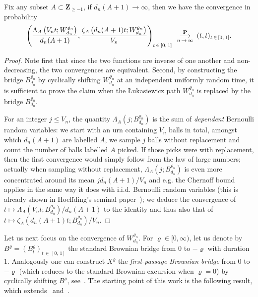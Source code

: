 \documentclass[AHL,Unicode,longabstracts,published]{cedram}
\newcommand{\ensembles}[1]{\mathbf{#1}}
\newcommand{\Z}{\ensembles{Z}}
\renewcommand{\P}{\ensembles{P}}
\newcommand{\1}{\ensembles{1}}
\renewcommand{\le}{\leqslant}
\renewcommand{\ge}{\geqslant}
\newcommand{\Wfn}{W_{d_n}^{\varrho_n}}
\newcommand{\Bfn}{B_{d_n}^{\varrho_n}}
\newcommand{\vertices}{V}
\newcommand{\cvproba}[1][n]{\enskip\mathop{\longrightarrow}^{\P}_{#1\,\to\, \infty}\enskip}
\begin{document}
\begin{lemm}\label{lem:proportion_feuilles}
Fix any subset $A \subset \Z_{\ge -1}$, if $d_n(A+1) \to \infty$, then we have the convergence in probability
\[
\left(\frac{\Lambda_A\left(\vertices_n t; \Wfn\right)}{d_n(A+1)}, \frac{\zeta_A\left(d_n(A+1) t; \Wfn\right)}{\vertices_n}\right)_{t\,\in\,[0,\,1]} \cvproba (t, t)_{t \,\in\,[0,\,1]}.
\]
\end{lemm}

\begin{proof}
Note first that since the two functions are inverse of one another and non-decreasing, the two convergences are equivalent. Second, by constructing the bridge $\Bfn$ by cyclically shifting $\Wfn$ at an independent uniformly random time, it is sufficient to prove the claim when the {\L}ukasiewicz path $\Wfn$ is replaced by the bridge $\Bfn$.

For an integer $j \le V_n$, the quantity $\Lambda_A(j; \Bfn)$ is the sum of \emph{dependent} Bernoulli random variables: we start with an urn containing $\vertices_n$ balls in total, amongst which $d_n(A+1)$ are labelled $A$, we sample $j$ balls without replacement and count the number of balls labelled $A$ picked. If those picks were with replacement, then the first convergence would simply follow from the law of large numbers; actually when sampling without replacement, $\Lambda_A(j; \Bfn)$ is even more concentrated around its mean $j d_n(A+1)/\vertices_n$ and e.g. the Chernoff bound applies in the same way it does with i.i.d. Bernoulli random variables (this is already shown in Hoeffding’s seminal paper~\cite{Hoe63}); we deduce the convergence of $t \mapsto \Lambda_A(\vertices_n t; \Bfn) / d_n(A+1)$ to the identity and thus also that of $t \mapsto \zeta_A(d_n(A+1) t; \Bfn)/\vertices_n$.
\end{proof}


Let us next focus on the convergence of $\Wfn$. For $\varrho \in [0,\infty)$, let us denote by $B^\varrho = (B^\varrho_t)_{t\,\in\, [0,\,1]}$ the standard Brownian bridge from $0$ to $-\varrho$ with duration $1$. Analogously one can construct $X^\varrho$ the \emph{first-passage Brownian bridge} from $0$ to $-\varrho$ (which reduces to the standard Brownian excursion when $\varrho = 0$) by cyclically shifting $B^\varrho$, see~\cite[Theorem~7]{BCP03}. The starting point of this work is the following result, which extends~\cite[Lemma~7]{BM14} and~\cite[Theorem~1.6]{Lei19}.
\end{document}
